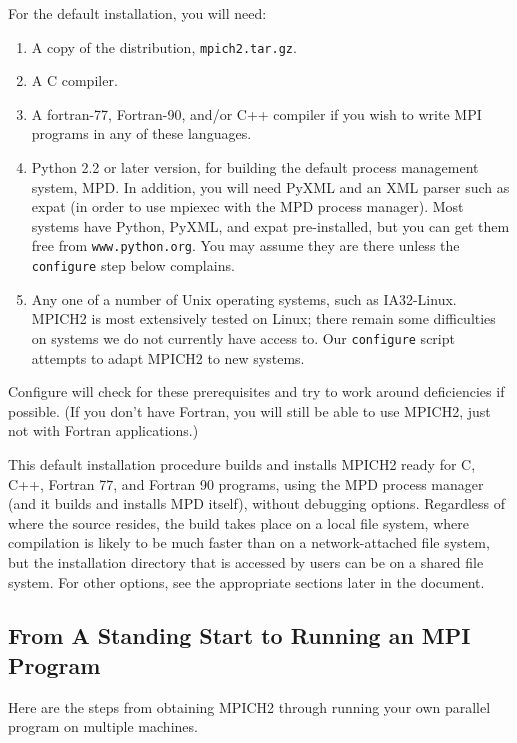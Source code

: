 \documentclass[dvipdfm,11pt]{article}
\begin{document}
For the default installation, you will need:
\begin{enumerate}
\item A copy of the distribution, \texttt{mpich2.tar.gz}.
\item A C compiler.
\item A fortran-77, Fortran-90, and/or C++ compiler if you wish to write
  MPI programs in any of these languages.
\item Python 2.2 or later version, for building the default process
  management system, MPD.  In addition, you will need 
  PyXML and an XML parser such as expat (in order
  to use mpiexec with the MPD process manager).  Most systems have
  Python, PyXML, and expat pre-installed, but you can get them free from
  \texttt{www.python.org}.  You may assume they are there unless the
  \texttt{configure} step below complains.
\item Any one of a number of Unix operating systems, such as IA32-Linux.
  MPICH2 is most extensively tested on Linux;  there remain some
  difficulties on systems we do not currently have access to.  Our
  \texttt{configure} script attempts to adapt MPICH2 to new systems. 
\end{enumerate}
Configure will check for these prerequisites and try to work around
deficiencies if possible.  (If you don't have Fortran, you will
still be able to use MPICH2, just not with Fortran applications.)

This default installation procedure builds and installs MPICH2 ready for
C, C++, Fortran 77, and Fortran 90 programs, using the MPD process
manager (and it 
builds and installs MPD itself), without debugging options.  Regardless
of where the source resides, the build takes place on a local file
system, where compilation is likely to be much faster than on a
network-attached file system, but the installation directory that is
accessed by users can be on a shared file system.  For other options,
see the appropriate sections later in the document.

\subsection{From A Standing Start to Running an MPI Program}
\label{sec:steps}
Here are the steps from obtaining MPICH2 through running your own
parallel program on multiple machines.
\end{document}
